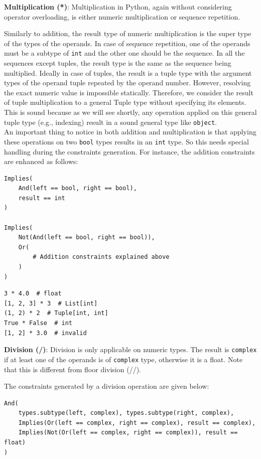 \textbf{Multiplication (*)}:
Multiplication in Python, again without considering operator overloading, is either numeric multiplication or sequence repetition.

Similarly to addition, the result type of numeric multiplication is the super type of the types of the operands. In case of sequence repetition, one of the operands must be a subtype of \lstinline|int| and the other one should be the sequence. In all the sequences except tuples, the result type is the same as the sequence being multiplied. Ideally in case of tuples, the result is a tuple type with the argument types of the operand tuple repeated by the operand number. However, resolving the exact numeric value is impossible statically. Therefore, we consider the result of tuple multiplication to a general Tuple type without specifying its elements. This is sound because as we will see shortly, any operation applied on this general tuple type (e.g., indexing) result in a sound general type like \lstinline|object|. \\
An important thing to notice in both addition and multiplication is that applying these operations on two \lstinline|bool| types results in an \lstinline|int| type. So this needs special handling during the constraints generation. For instance, the addition constraints are enhanced as follows:
\begin{lstlisting}
Implies(
	And(left == bool, right == bool),
	result == int
)

Implies(
	Not(And(left == bool, right == bool)),
	Or(
		# Addition constraints explained above
	)
)
\end{lstlisting}

\begin{lstlisting}
3 * 4.0  # float
[1, 2, 3] * 3  # List[int]
(1, 2) * 2  # Tuple[int, int]
True * False  # int
[1, 2] * 3.0  # invalid
\end{lstlisting}

\textbf{Division (/)}: Division is only applicable on numeric types. The result is \lstinline|complex| if at least one of the operands is of \lstinline|complex| type, otherwise it is a float. Note that this is different from floor division (//).

The constraints generated by a division operation are given below:

\begin{lstlisting}
And(
	types.subtype(left, complex), types.subtype(right, complex),
	Implies(Or(left == complex, right == complex), result == complex),
	Implies(Not(Or(left == complex, right == complex)), result == float)
)
\end{lstlisting}

